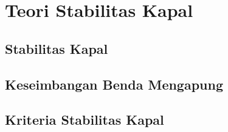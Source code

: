 \section{Teori Stabilitas Kapal}
\label{sec:teori-stabilitas-kapal}


\subsection{Stabilitas Kapal}
\label{subsec:stabilitas-kapal}



\subsection{Keseimbangan Benda Mengapung}
\label{subsec:keseimbangan-benda-mengapung}

\subsection{Kriteria Stabilitas Kapal}
\label{subsec:kriteria-stabilitas}


